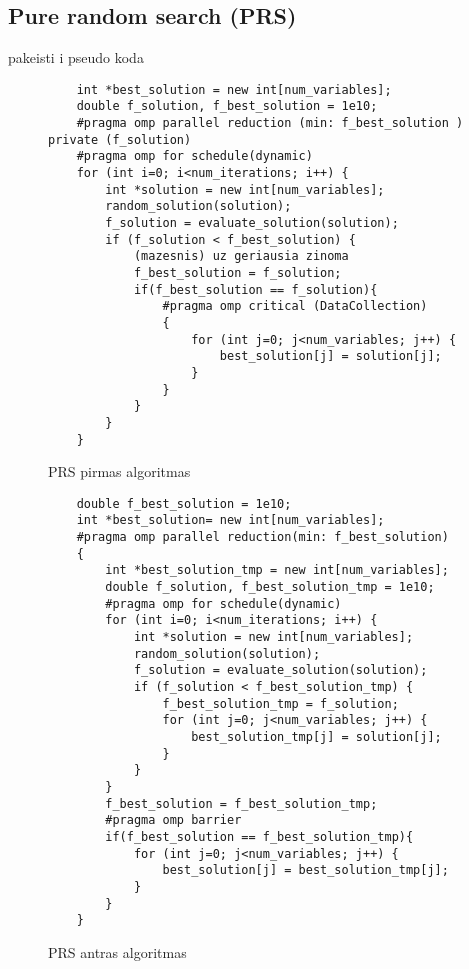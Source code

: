 \documentclass[a4paper,10pt]{article}
\begin{document}
\subsection{Pure random search (PRS)}

pakeisti i pseudo koda
\begin{figure}[ht]
	\begin{verbatim}
    int *best_solution = new int[num_variables]; 
    double f_solution, f_best_solution = 1e10; 
    #pragma omp parallel reduction (min: f_best_solution ) private (f_solution)
    #pragma omp for schedule(dynamic)
    for (int i=0; i<num_iterations; i++) {
        int *solution = new int[num_variables];
        random_solution(solution);
        f_solution = evaluate_solution(solution);
        if (f_solution < f_best_solution) { 
            (mazesnis) uz geriausia zinoma
            f_best_solution = f_solution;
            if(f_best_solution == f_solution){
                #pragma omp critical (DataCollection)
                {
                    for (int j=0; j<num_variables; j++) {
                        best_solution[j] = solution[j];
                    }
                }
            }
        }
    }
\end{verbatim}
	\caption{PRS pirmas algoritmas}
	\label {PRS1}
\end{figure}
\begin{figure}[ht]
	\begin{verbatim}
    double f_best_solution = 1e10;
    int *best_solution= new int[num_variables]; 
    #pragma omp parallel reduction(min: f_best_solution) 
    {
        int *best_solution_tmp = new int[num_variables];  
        double f_solution, f_best_solution_tmp = 1e10; 
        #pragma omp for schedule(dynamic)
        for (int i=0; i<num_iterations; i++) {
            int *solution = new int[num_variables];   
            random_solution(solution);            
            f_solution = evaluate_solution(solution);
            if (f_solution < f_best_solution_tmp) {  
                f_best_solution_tmp = f_solution;  
                for (int j=0; j<num_variables; j++) {
                    best_solution_tmp[j] = solution[j];
                }
            }
        }
        f_best_solution = f_best_solution_tmp;  
        #pragma omp barrier
        if(f_best_solution == f_best_solution_tmp){
            for (int j=0; j<num_variables; j++) {
                best_solution[j] = best_solution_tmp[j];
            }
        }
    }
\end{verbatim}
	\caption{PRS antras algoritmas}
	\label {PRS2}
\end{figure}
\end{document}

